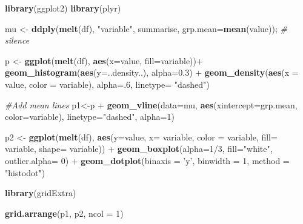 \documentclass[]{article}
\newenvironment{Shaded}{\begin{snugshade}}{\end{snugshade}}
\newcommand{\KeywordTok}[1]{\textcolor[rgb]{0.13,0.29,0.53}{\textbf{{#1}}}}
\newcommand{\DataTypeTok}[1]{\textcolor[rgb]{0.13,0.29,0.53}{{#1}}}
\newcommand{\DecValTok}[1]{\textcolor[rgb]{0.00,0.00,0.81}{{#1}}}
\newcommand{\FloatTok}[1]{\textcolor[rgb]{0.00,0.00,0.81}{{#1}}}
\newcommand{\StringTok}[1]{\textcolor[rgb]{0.31,0.60,0.02}{{#1}}}
\newcommand{\CommentTok}[1]{\textcolor[rgb]{0.56,0.35,0.01}{\textit{{#1}}}}
\newcommand{\NormalTok}[1]{{#1}}
\begin{document}
\begin{Shaded}
\begin{Highlighting}[]
    \KeywordTok{library}\NormalTok{(ggplot2)}
    \KeywordTok{library}\NormalTok{(plyr)}

    \NormalTok{mu <-}\StringTok{ }\KeywordTok{ddply}\NormalTok{(}\KeywordTok{melt}\NormalTok{(df), }\StringTok{"variable"}\NormalTok{, summarise, }\DataTypeTok{grp.mean=}\KeywordTok{mean}\NormalTok{(value)); }\CommentTok{# silence}
    
    \NormalTok{p <-}\StringTok{ }\KeywordTok{ggplot}\NormalTok{(}\KeywordTok{melt}\NormalTok{(df), }\KeywordTok{aes}\NormalTok{(}\DataTypeTok{x=}\NormalTok{value, }\DataTypeTok{fill=}\NormalTok{variable))+}\StringTok{ }
\StringTok{      }\KeywordTok{geom_histogram}\NormalTok{(}\KeywordTok{aes}\NormalTok{(}\DataTypeTok{y=}\NormalTok{..density..),  }\DataTypeTok{alpha=}\FloatTok{0.3}\NormalTok{) +}
\StringTok{      }\KeywordTok{geom_density}\NormalTok{(}\KeywordTok{aes}\NormalTok{(}\DataTypeTok{x =} \NormalTok{value, }\DataTypeTok{color =} \NormalTok{variable), }\DataTypeTok{alpha=}\NormalTok{.}\DecValTok{6}\NormalTok{, }\DataTypeTok{linetype=} \StringTok{"dashed"}\NormalTok{)}
    
    \CommentTok{#Add mean lines}
    \NormalTok{p1<-p +}\StringTok{ }\KeywordTok{geom_vline}\NormalTok{(}\DataTypeTok{data=}\NormalTok{mu, }\KeywordTok{aes}\NormalTok{(}\DataTypeTok{xintercept=}\NormalTok{grp.mean, }\DataTypeTok{color=}\NormalTok{variable),}
                 \DataTypeTok{linetype=}\StringTok{"dashed"}\NormalTok{, }\DataTypeTok{alpha=}\DecValTok{1}\NormalTok{)}
    
    \NormalTok{p2 <-}\StringTok{ }\KeywordTok{ggplot}\NormalTok{(}\KeywordTok{melt}\NormalTok{(df), }\KeywordTok{aes}\NormalTok{(}\DataTypeTok{y=}\NormalTok{value,  }\DataTypeTok{x=} \NormalTok{variable, }\DataTypeTok{color =} \NormalTok{variable, }
                               \DataTypeTok{fill=} \NormalTok{variable, }\DataTypeTok{shape=} \NormalTok{variable)) +}\StringTok{  }
\StringTok{      }\KeywordTok{geom_boxplot}\NormalTok{(}\DataTypeTok{alpha=}\DecValTok{1}\NormalTok{/}\DecValTok{3}\NormalTok{, }\DataTypeTok{fill=}\StringTok{"white"}\NormalTok{, }\DataTypeTok{outlier.alpha=} \DecValTok{0}\NormalTok{) +}\StringTok{ }
\StringTok{      }\KeywordTok{geom_dotplot}\NormalTok{(}\DataTypeTok{binaxis =} \StringTok{'y'}\NormalTok{, }\DataTypeTok{binwidth =} \DecValTok{1}\NormalTok{, }\DataTypeTok{method =} \StringTok{"histodot"}\NormalTok{)}
    
    \KeywordTok{library}\NormalTok{(gridExtra)}
    
    \KeywordTok{grid.arrange}\NormalTok{(p1, p2, }\DataTypeTok{ncol =} \DecValTok{1}\NormalTok{)}
\end{Highlighting}
\end{Shaded}
\end{document}
